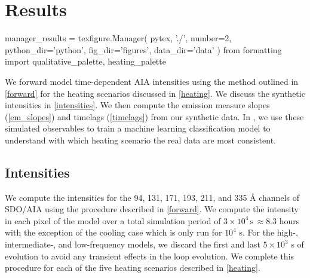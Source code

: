 \section{Results}\label{results}

\begin{pycode}
manager_results = texfigure.Manager(
    pytex,
    './',
    number=2,
    python_dir='python',
    fig_dir='figures',
    data_dir='data'
)
from formatting import qualitative_palette, heating_palette
\end{pycode}

We forward model time-dependent AIA intensities using the method outlined in \autoref{forward} for the heating scenarios discussed in \autoref{heating}. We discuss the synthetic intensities in \autoref{intensities}. We then compute the emission measure slopes (\autoref{em_slopes}) and timelags (\autoref{timelags}) from our synthetic data. In , we use these simulated observables to train a machine learning classification model to understand with which heating scenario the real data are most consistent.

\subsection{Intensities}\label{intensities}

We compute the intensities for the 94, 131, 171, 193, 211, and 335 \AA{} channels of SDO/AIA using the procedure described in \autoref{forward}. We compute the intensity in each pixel of the model \AR{} over a total simulation period of $3\times10^4\,\mathrm{s}\,\approx8.3$ hours with the exception of the cooling case which is only run for $10^4$ s. For the high-, intermediate-, and low-frequency models, we discard the first and last $5\times10^3$ s of evolution to avoid any transient effects in the loop evolution. We complete this procedure for each of the five heating scenarios described in \autoref{heating}.

